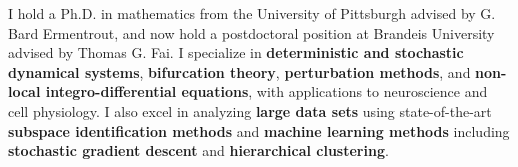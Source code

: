 I hold a Ph.D. in mathematics from the University of Pittsburgh advised by G. Bard Ermentrout, and now hold a postdoctoral position at Brandeis University advised by Thomas G. Fai. I specialize in \textbf{deterministic and stochastic dynamical systems}, \textbf{bifurcation theory}, \textbf{perturbation methods}, and \textbf{non-local integro-differential equations}, with applications to neuroscience and cell physiology.  I also excel in analyzing \textbf{large data sets} using state-of-the-art \textbf{subspace identification methods} and \textbf{machine learning methods} including \textbf{stochastic gradient descent} and \textbf{hierarchical clustering}.